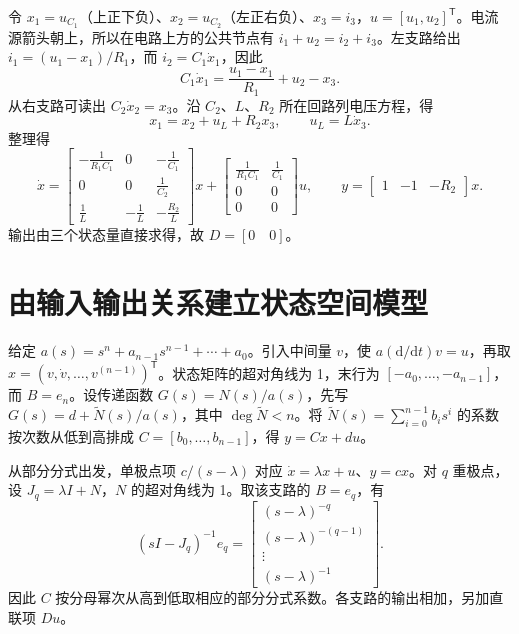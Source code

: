 
\sol 令 $x_1=u_{C_1}$（上正下负）、$x_2=u_{C_2}$（左正右负）、$x_3=i_3$，$u=[u_1,u_2]^{\mathsf T}$。电流源箭头朝上，所以在电路上方的公共节点有 $i_1+u_2=i_2+i_3$。左支路给出 $i_1=(u_1-x_1)/R_1$，而 $i_2=C_1\dot x_1$，因此
\[
C_1\dot x_1=\frac{u_1-x_1}{R_1}+u_2-x_3.
\]
从右支路可读出 $C_2\dot x_2=x_3$。沿 $C_2$、$L$、$R_2$ 所在回路列电压方程，得
\[
x_1=x_2+u_L+R_2x_3,\qquad u_L=L\dot x_3.
\]
整理得
\[
\dot x=
\begin{bmatrix}
-\frac1{R_1C_1}&0&-\frac1{C_1}\\
0&0&\frac1{C_2}\\
\frac1L&-\frac1L&-\frac{R_2}L
\end{bmatrix}x+
\begin{bmatrix}
\frac1{R_1C_1}&\frac1{C_1}\\
0&0\\
0&0
\end{bmatrix}u,\qquad
y=\begin{bmatrix}1&-1&-R_2\end{bmatrix}x.
\]
输出由三个状态量直接求得，故 $D=[0\quad 0]$。

\section{由输入输出关系建立状态空间模型}

给定 $a(s)=s^n+a_{n-1}s^{n-1}+\cdots+a_0$。引入中间量 $v$，使 $a(\mathrm d/\mathrm dt)v=u$，再取 $x=(v,\dot v,\ldots,v^{(n-1)})^{\mathsf T}$。状态矩阵的超对角线为 1，末行为 $[-a_0,\ldots,-a_{n-1}]$，而 $B=e_n$。设传递函数 $G(s)=N(s)/a(s)$，先写 $G(s)=d+\widetilde N(s)/a(s)$，其中 $\deg\widetilde N<n$。将 $\widetilde N(s)=\sum_{i=0}^{n-1}b_is^i$ 的系数按次数从低到高排成 $C=[b_0,\ldots,b_{n-1}]$，得 $y=Cx+du$。


从部分分式出发，单极点项 $c/(s-\lambda)$ 对应 $\dot x=\lambda x+u$、$y=cx$。对 $q$ 重极点，设 $J_q=\lambda I+N$，$N$ 的超对角线为 1。取该支路的 $B=e_q$，有
\[
(sI-J_q)^{-1}e_q=
\begin{bmatrix}
(s-\lambda)^{-q}\\ (s-\lambda)^{-(q-1)}\\ \vdots\\ (s-\lambda)^{-1}
\end{bmatrix}.
\]
因此 $C$ 按分母幂次从高到低取相应的部分分式系数。各支路的输出相加，另加直联项 $Du$。

